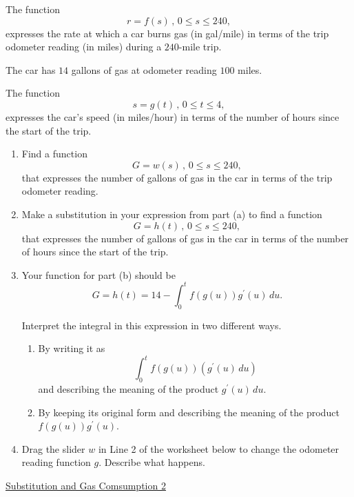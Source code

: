 \documentclass{ximera}
\begin{document}
\begin{example} \label{Ex:KDfdfer3rER}

The function
\[
    r = f(s) \, , \, 0 \leq s \leq 240,
\]
expresses the rate at which a car burns gas (in gal/mile) in terms of the trip odometer reading (in miles) during a $240$-mile trip.

The car has $14$ gallons of gas at odometer reading $100$ miles.

The function 
\[
      s = g(t) \, , \, 0\leq t \leq 4 ,
\]
expresses the car's speed (in miles/hour) in terms of the number of hours since the start of the trip.

\begin{enumerate}
\item Find a function 
\[
      G = w(s) \, , \, 0 \leq s \leq 240,
\]
that expresses the number of gallons of gas in the car in terms of the trip odometer reading.

\item Make a substitution in your expression from part (a) to find a function 
\[
  G = h(t) \, , \, 0 \leq s \leq 240,
\]
that expresses the number of gallons of gas in the car in terms of the number of hours since the start of the trip.

\item Your function for part (b) should be
\[
     G = h(t) = 14 - \int_0^t f(g(u))g^\prime(u)  \, du .
\]

Interpret the integral in this expression in two different ways.

\begin{enumerate}
\item By writing it as
\[
   \int_0^t f(g(u))(  g^\prime(u)  \, du )
\]
and describing the meaning of the product $g^\prime(u)\, du$.

\item By keeping its original form and describing the meaning of the product $f(g(u))g^\prime(u)$.

\end{enumerate}

\item Drag the slider $w$ in Line 2 of the worksheet below to change the odometer reading function $g$. Describe what happens.

\end{enumerate}

\begin{onlineOnly}
    \begin{center}
\end{center}
\end{onlineOnly}

\href{https://www.desmos.com/calculator/gsdzd0lbva}{Substitution and Gas Comsumption 2}

\end{example}
\end{document}
